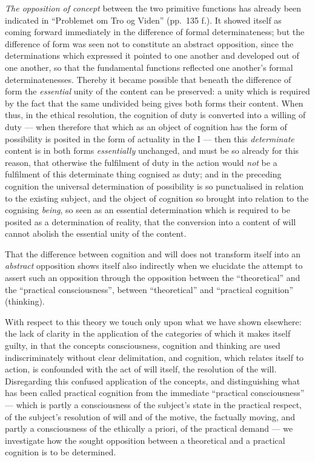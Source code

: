 \documentclass[12pt,a4paper]{book}
\begin{document}
\emph{The opposition of concept} between the two primitive functions has
already been indicated in ``Problemet om Tro og Viden'' (pp.\ 135 f.). It
showed itself as coming forward immediately in the difference of formal
determinateness; but the difference of form was seen not to constitute an
abstract opposition, since the determinations which expressed it pointed to
one another and developed out of one another, so that the fundamental
functions reflected one another's formal determinatenesses.
Thereby it became possible that beneath the difference of form the
\emph{essential} unity of the content can be preserved: a unity which is
required by the fact that the same undivided being gives both forms their
content. When thus, in the ethical resolution, the cognition of duty is
converted into a willing of duty --- when therefore that which as an object of
cognition has the form of possibility is posited in the form of actuality in
the I --- then this \emph{determinate} content is in both forms
\emph{essentially} unchanged, and must be so already for this reason, that
otherwise the fulfilment of duty in the action would \emph{not} be a
fulfilment of this determinate thing cognised as duty; and in the preceding
cognition the universal determination of possibility is so punctualised in
relation to the existing subject, and the object of cognition so brought into
relation to the cognising \emph{being}, so seen as an essential determination
which is required to be posited as a determination of reality, that the
conversion into a content of will cannot abolish the essential unity of the
content.

That the difference between cognition and will does not transform itself into
an \emph{abstract} opposition shows itself also indirectly when we elucidate
the attempt to assert such an opposition through the opposition between the
``theoretical'' and the ``practical consciousness'', between ``theoretical''
and ``practical cognition'' (thinking).

With respect to this theory we touch only upon what we have shown elsewhere:
the lack of clarity in the application of the categories of which it makes
itself guilty, in that the concepts consciousness, cognition and thinking are
used indiscriminately without clear delimitation, and cognition, which relates
itself to action, is confounded with the act of will itself, the resolution of
the will. Disregarding this confused application of the concepts, and
distinguishing what has been called practical cognition from the immediate
``practical consciousness'' --- which is partly a consciousness of the
subject's state in the practical respect, of the subject's resolution of will
and of the motive, the factually moving, and partly a consciousness of the
ethically a priori, of the practical demand --- we investigate how the sought
opposition between a theoretical and a practical cognition is to be
determined.
\end{document}
